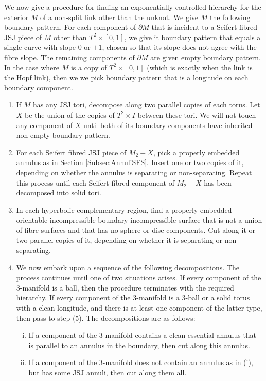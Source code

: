 \documentclass[oneside]{amsart}
\numberwithin{equation}{section}
\theoremstyle{plain}
\theoremstyle{definition}
\begin{document}
We now give a procedure for finding an exponentially controlled hierarchy for the exterior $M$ of a non-split link other than the unknot.
We give $M$ the following boundary pattern. For each component of $\partial M$ that is incident to a Seifert fibred JSJ piece
of $M$ other than $T^2 \times [0,1]$, we give it boundary pattern that equals a single curve with slope $0$ or $\pm 1$, chosen so that its slope does
not agree with the fibre slope. The remaining components of $\partial M$ are given empty boundary pattern.
In the case where $M$ is a copy of $T^2 \times [0,1]$ (which is exactly when the
link is the Hopf link), then we we pick boundary pattern that is a longitude on each boundary component.
\begin{enumerate}
\item If $M$ has any JSJ tori, decompose along two parallel copies of each torus. Let $X$ be the union of the copies of $T^2 \times I$ between these tori. We will not touch any component of $X$ until both of its boundary components have inherited non-empty boundary pattern.
\item For each Seifert fibred JSJ piece of $M_2 - X$, pick a properly embedded annulus 
as in Section \ref{Subsec:AnnuliSFS}. Insert one or two copies of it, depending on whether the annulus is separating or non-separating.
Repeat this process until each Seifert fibred component of $M_2 - X$ has been decomposed into solid tori.
\item In each hyperbolic complementary region, find a properly embedded orientable incompressible boundary-incompressible surface that
is not a union of fibre surfaces and that has no sphere or disc components. Cut along it or two parallel copies of it, depending on whether it is separating
or non-separating.
\item We now embark upon a sequence of the following decompositions. The process continues until one of two situations arises. If every component of the 3-manifold is a ball, then the procedure terminates with the required hierarchy. If every component of the 3-manifold is a 3-ball or a solid torus with a clean longitude, and there is at least one component of the latter type, then pass to step (5). The decompositions are as follows:
\begin{enumerate}[(i)]
\item If a component of the 3-manifold contains a clean essential annulus that is parallel to an annulus in the boundary, then cut along this annulus.
\item If a component of the 3-manifold does not contain an annulus as in (i), but has some JSJ annuli, then cut along them all.

\end{enumerate}
\end{enumerate}
\end{document}
